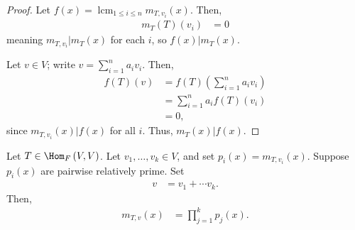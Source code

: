 \documentclass[10pt]{mypackage}
\DeclareMathOperator*{\lcm}{lcm}
\begin{document}
\begin{proof}
  Let $f(x) = \lcm_{1\leq i\leq n} m_{T,v_i}\left(x\right)$. Then,
  \begin{align*}
    m_{T}\left(T\right)\left(v_i\right) &= 0
  \end{align*}
  meaning $m_{T,v_i}|m_{T}(x)$ for each $i$, so $f(x) | m_{T}(x)$.\newline

  Let $v\in V$; write $v = \sum_{i=1}^{n}a_iv_i$. Then,
  \begin{align*}
    f(T)(v) &= f(T)\left(\sum_{i=1}^{n}a_iv_i\right)\\
            &= \sum_{i=1}^{n}a_if(T)\left(v_i\right)\\
            &= 0,
  \end{align*}
  since $m_{T,v_i}(x)|f(x)$ for all $i$. Thus, $m_{T}(x) | f(x)$.
\end{proof}
\begin{lemma}
  Let $T \in \Hom_{F}\left(V,V\right)$. Let $v_1,\dots,v_k\in V$, and set $p_i(x) = m_{T,v_i}(x)$. Suppose $p_i(x)$ are pairwise relatively prime. Set
  \begin{align*}
    v &= v_1 + \cdots v_k.
  \end{align*}
  Then,
  \begin{align*}
    m_{T,v}\left(x\right) &= \prod_{j=1}^{k}p_j(x).
  \end{align*}
\end{lemma}
\end{document}
